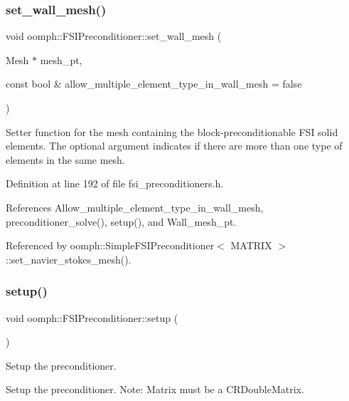 \subsubsection{\texorpdfstring{set\+\_\+wall\+\_\+mesh()}{set\_wall\_mesh()}}
{\footnotesize\ttfamily void oomph\+::\+F\+S\+I\+Preconditioner\+::set\+\_\+wall\+\_\+mesh (\begin{DoxyParamCaption}\item[{Mesh $\ast$}]{mesh\+\_\+pt,  }\item[{const bool \&}]{allow\+\_\+multiple\+\_\+element\+\_\+type\+\_\+in\+\_\+wall\+\_\+mesh = {\ttfamily false} }\end{DoxyParamCaption})\hspace{0.3cm}{\ttfamily [inline]}}



Setter function for the mesh containing the block-\/preconditionable F\+SI solid elements. The optional argument indicates if there are more than one type of elements in the same mesh. 



Definition at line 192 of file fsi\+\_\+preconditioners.\+h.



References Allow\+\_\+multiple\+\_\+element\+\_\+type\+\_\+in\+\_\+wall\+\_\+mesh, preconditioner\+\_\+solve(), setup(), and Wall\+\_\+mesh\+\_\+pt.



Referenced by oomph\+::\+Simple\+F\+S\+I\+Preconditioner$<$ M\+A\+T\+R\+I\+X $>$\+::set\+\_\+navier\+\_\+stokes\+\_\+mesh().

\mbox{\label{classoomph_1_1FSIPreconditioner_adadfe9f4332af610b00f1f45d1ad432e}} 
\subsubsection{\texorpdfstring{setup()}{setup()}}
{\footnotesize\ttfamily void oomph\+::\+F\+S\+I\+Preconditioner\+::setup (\begin{DoxyParamCaption}{ }\end{DoxyParamCaption})}



Setup the preconditioner. 

Setup the preconditioner. Note\+: Matrix must be a C\+R\+Double\+Matrix. 

